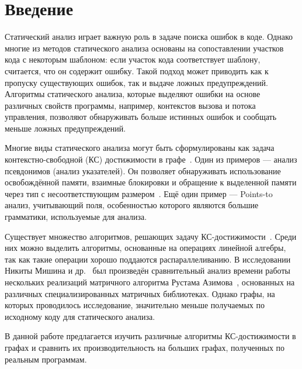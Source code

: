 \section*{Введение}

Статический анализ играет важную роль в задаче поиска ошибок в коде. Однако многие из методов статического анализа основаны на сопоставлении участков кода с некоторым шаблоном: если участок кода соответствует шаблону, считается, что он содержит ошибку. Такой подход может приводить как к пропуску существующих ошибок, так и выдаче ложных предупреждений. Алгоритмы статического анализа, которые выделяют ошибки на основе различных свойств программы, например, контекстов вызова и потока управления, позволяют обнаруживать больше истинных ошибок и сообщать меньше ложных предупреждений.

Многие виды статического анализа могут быть сформулированы как задача контекстно-свободной (КС) достижимости в графе~\cite{context_sensitive_points_to_analysis_for_java, dataflow_analysis_via_graph_reachability, precise_interprocedural_dataflow_analysis, program_analysis_via_graph_reachability}. Один из примеров --- анализ псевдонимов (анализ указателей). Он позволяет обнаруживать использование освобождённой памяти, взаимные блокировки и обращение к выделенной памяти через тип с несоответствующим размером~\cite{alias_analysis}. Ещё один пример --- Points-to анализ, учитывающий поля, особенностью которого являются большие грамматики, используемые для анализа.

Существует множество алгоритмов, решающих задачу КС-достижимости~\cite{cfpq_algo_1, cfpq_algo_2, cfpq_algo_3, rustam_algorithm}. Среди них можно выделить алгоритмы, основанные на операциях линейной алгебры, так как такие операции хорошо поддаются распараллеливанию. В исследовании Никиты Мишина и др.~\cite{eval_cfpq} был произведён сравнительный анализ времени работы нескольких реализаций матричного алгоритма Рустама Азимова~\cite{rustam_algorithm}, основанных на различных специализированных матричных библиотеках. Однако графы, на которых проводилось исследование, значительно меньше получаемых по исходному коду для статического анализа. 

В данной работе предлагается изучить различные алгоритмы КС-достижимости в графах и сравнить их производительность на больших графах, полученных по реальным программам.
